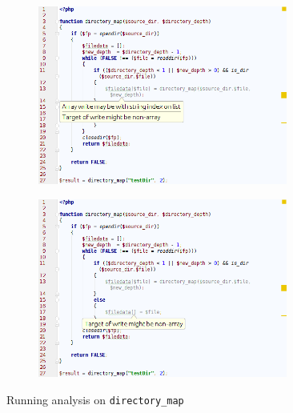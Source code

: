 \begin{figure}
\centering
\begin{subfigure}{\textwidth}
\centering
\includegraphics[width=0.9\textwidth]{chapters/caseStudy/screens/dir1}
\label{fig:directoryScreenshot1}

\end{subfigure}
\begin{subfigure}{\textwidth}
\centering
\includegraphics[width=0.9\textwidth]{chapters/caseStudy/screens/dir2}
\label{fig:directoryScreenshot2}

\end{subfigure}
\caption{Running analysis on \texttt{directory\_map}}
\label{fig:directoryScreenshot}
\end{figure}



